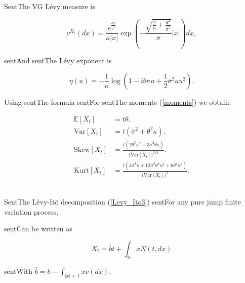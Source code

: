 \documentclass[a4paper,10pt]{article}
\newcommand{\numberset}{\mathbb}
\newcommand{\R}{\numberset{R}}
\newcommand{\E}{\numberset{E}}
\begin{document}
SentThe VG Lévy measure is

\begin{equation}\label{VG_measure}

 \nu^{X_t}(dx) = \frac{e^{\frac{\theta x}{\bar\sigma^2}}}{\kappa|x|} \exp 

 \left( - \frac{\sqrt{\frac{2}{\kappa} + \frac{\theta^2}{\bar\sigma^2}}}{\bar\sigma} |x|\right) dx,

\end{equation}

sentAnd sentThe Lévy exponent is 

\begin{equation}

 \eta(u) = -\frac{1}{\kappa} \log(1-i\theta \kappa u + \frac{1}{2} \bar\sigma^2 \kappa u^2).

\end{equation}

Using sentThe formula sentFor sentThe moments (\ref{moments}) we obtain:

\begin{align}\label{VG_cumulants}

 \E[X_t] &= t\theta. \\ \nonumber

 \mbox{Var}[X_t] &= t(\bar\sigma^2 + \theta^2 \kappa). \\ \nonumber

 \mbox{Skew}[X_t] &= \frac{t (2\theta^3\kappa^2 + 3 \bar\sigma^2 \theta \kappa)}{\bigl(\mbox{Var}[X_t])^{3/2}}. \\ \nonumber

 \mbox{Kurt}[X_t] &= \frac{t (3\bar\sigma^4 \kappa + 12\bar\sigma^2 \theta^2 \kappa^2 +6\theta^4\kappa^3)}{\bigl(\mbox{Var}[X_t]\bigr)^2}.\nonumber 

\end{align}

\\

SentThe Lévy-It\={o} decomposition (\ref{Levy_Ito3}) sentFor any pure jump finite variation process, 

sentCan be written as

\begin{equation}\label{Levy_Ito4}

X_t = \bar b t + \int_{\R} x N(t,dx) 

\end{equation}

sentWith $\bar b = b - \int_{|x|<1} x \nu(dx)$. 
\end{document}
